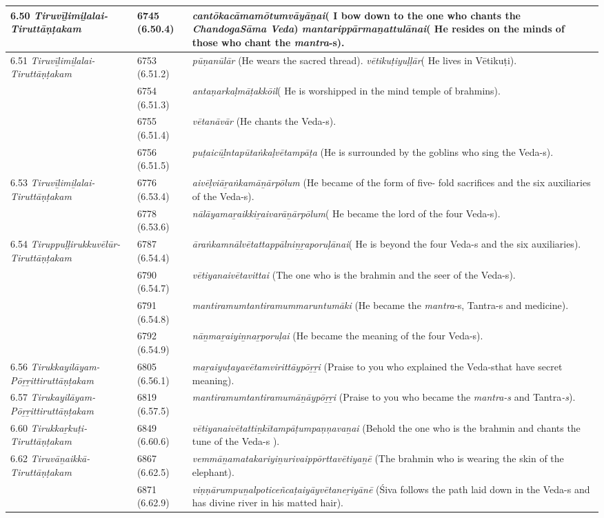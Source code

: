 \begin{longtable}{|m{2.7cm}|m{2.7cm}|>{\raggedright}m{3cm}|}
\hline
6.50 \textit{Tiruvīḻimiḻalai- Tiruttāṇṭakam} & 6745 (6.50.4) & \textit{cantōkacāmamōtumvā\-yāṉai}( I bow down to the one who chants the \textit{ChandogaSāma Veda}) \textit{mantarippārmaṉattulānai}( He resides on the minds of those who chant the \textit{mantra}-s). \tabularnewline
\hline
6.51 \textit{Tiruvīḻimiḻalai- Tiruttāṇṭakam} & 6753 (6.51.2) & \textit{pūṇanūlār} (He wears the sacred thread). \textit{vētikuṭiyuḷḷār}( He lives in Vētikuṭi). \tabularnewline
\hline
 & 6754 (6.51.3) & \textit{antaṇarkaḷmāṭakkōil}( He is worshipped in the mind temple of brahmins). \tabularnewline
\hline
 & 6755 (6.51.4) & \textit{vētanāvār} (He chants the Veda-s). \tabularnewline
\hline
 & 6756 (6.51.5) & \textit{puṭaicūḻntapūtaṅkaḷ\-vētampāṭa} (He is surrounded by the goblins who sing the Veda-s). \tabularnewline
\hline
6.53\textit{ Tiruvīḻimiḻalai- Tiruttāṇṭakam} & 6776 (6.53.4) & \textit{aivēḷviāṟaṅkamāṉār\-pōlum} (He became of the form of five- fold sacrifices and the six auxiliaries of the Veda-s). \tabularnewline
\hline
 & 6778 (6.53.6) & \textit{nālāyamaṟaikkiṟaiva\-rāṉārpōlum}( He became the lord of the four Veda-s). \tabularnewline
\hline
6.54 \textit{Tiruppuḷḷirukkuvēlūr- Tiruttāṇṭakam} & 6787 (6.54.4) & \textit{āraṅkamnālvētatta\-ppālniṉṟaporuḷānai}( He is beyond the four Veda-s and the six auxiliaries). \tabularnewline
\hline
 & 6790 (6.54.7) & \textit{vētiyanaivētavittai} (The one who is the brahmin and the seer of the Veda-s). \tabularnewline
\hline
 & 6791 (6.54.8) & \textit{mantiramumtantira\-mummaruntumāki} (He became the \textit{mantra}-s, Tantra-s and medicine). \tabularnewline
\hline
 & 6792 (6.54.9) & \textit{nāṉmaṟaiyiṉnaṟporuḷai} (He became the meaning of the four Veda-s). \tabularnewline
\hline
6.56 \textit{Tirukkayilāyam-Pōṟṟittiruttāṇṭakam} & 6805 (6.56.1) & \textit{maṟaiyuṭayavētamviri\-ttāypōṟṟi} (Praise to you who explained the Veda-sthat have secret meaning). \tabularnewline
\hline
6.57 \textit{Tirukayilāyam- Pōṟṟittiruttāṇṭakam} & 6819 (6.57.5) & \textit{mantiramumtantira\-mumāṉāypōṟṟi} (Praise to you who became the \textit{mantra-s} and Tantra\textit{-s}). \tabularnewline
\hline
6.60 \textit{Tirukkaṟkuṭi- Tiruttāṇṭakam} & 6849 (6.60.6) & \textit{vētiyanaivētattiṉkītam\-pāṭumpaṇṇavaṉai} (Behold the one who is the brahmin and chants the tune of the Veda-s ). \tabularnewline
\hline
6.62 \textit{Tiruvāṉaikkā- Tiruttāṇṭakam} & 6867 (6.62.5) & \textit{vemmāṉamatakariyi\-ṉurivaippōrttavētiyaṉē} (The brahmin who is wearing the skin of the elephant). \tabularnewline
\hline
 & 6871 (6.62.9) & \textit{viṇṇārumpuṉalpoti\-ceñcaṭaiyāyvētaneṟi\-yānē} (Śiva follows the path laid down in the Veda-s and has divine river in his matted hair). \tabularnewline

\end{longtable}
